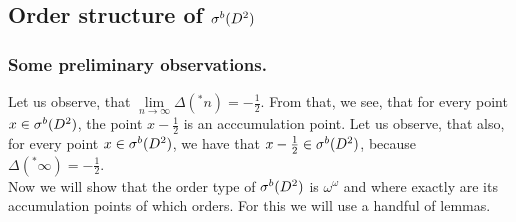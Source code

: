 \subsection{Order structure of ${\mathcal{\sigma}^b(D^2)}$}
\subsubsection{Some preliminary observations.}
Let us observe, that $\lim\limits_{n \to \infty} \Delta(^*n) = -\frac{1}{2}$. From that, we see, 
that for every point $x \in {\mathcal{\sigma}^b(D^2)}$, the point $x - \frac{1}{2}$ is an acccumulation point. 
Let us observe, that also, for every point $x \in {\mathcal{\sigma}^b(D^2)}$, we have that $x - \frac{1}{2} \in {\mathcal{\sigma}^b(D^2)}$, 
because $\Delta(^*\infty) = -\frac{1}{2}$. \\

Now we will show that the order type of ${\mathcal{\sigma}^b(D^2)}$ is $\omega^\omega$ and where exactly are 
its accumulation points of which orders. For this we will use  
a handful of lemmas. 

